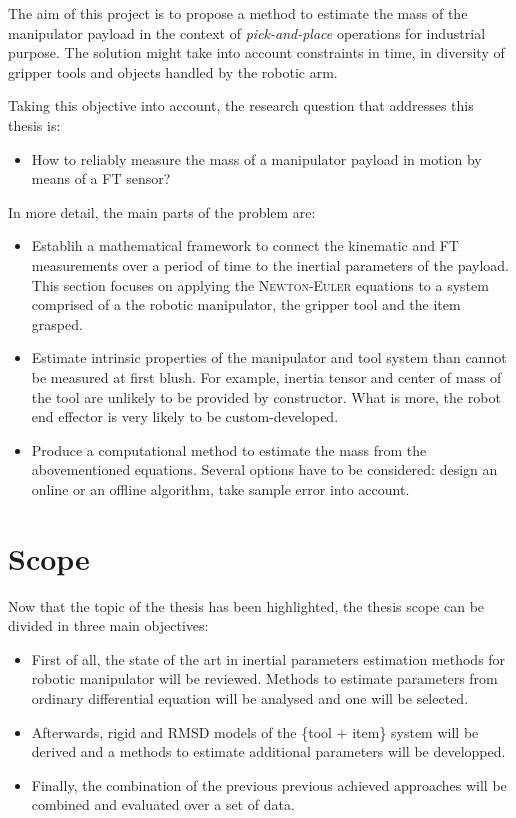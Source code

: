 \documentclass[/home/francois/latex/report/main.tex]{subfiles}
\begin{document}
The aim of this project is to propose a method to estimate the mass of the manipulator payload in the context of \textit{pick-and-place} operations for industrial purpose. The solution might take into account constraints in time, in diversity of gripper tools and objects handled by the robotic arm.

Taking this objective into account, the research question that addresses this thesis is:

\begin{itemize}%
  \renewcommand{\labelitemi}{$\Rightarrow$}
 \item How to reliably measure the mass of a manipulator payload in motion by means of a \ac{FT} sensor?
\end{itemize}

In more detail, the main parts of the problem are:

\begin{itemize}
 \item Establih a mathematical framework to connect the kinematic and \ac{FT} measurements over a period of time to the inertial parameters of the payload. This section focuses on applying the \textsc{Newton-Euler} equations to a system comprised of a the robotic manipulator, the gripper tool and the item grasped.
 \item Estimate intrinsic properties of the manipulator and tool system than cannot be measured at first blush. For example, inertia tensor and center of mass of the tool are unlikely to be provided by constructor. What is more, the robot end effector is very likely to be custom-developed.
 \item Produce a computational method to estimate the mass from the abovementioned equations. Several options have to be considered: design an online or an offline algorithm, take sample error into account.
\end{itemize}

\section{Scope}

Now that the topic of the thesis has been highlighted, the thesis scope can be divided in three main objectives:

\begin{itemize}
	\item First of all, the state of the art in inertial parameters estimation methods for robotic manipulator will be reviewed. Methods to estimate parameters from ordinary differential equation will be analysed and one will be selected.
	\item Afterwards, rigid and \ac{RMSD} models of the \{tool + item\} system will be derived and a methods to estimate additional parameters will be developped.
	\item Finally, the combination of the previous previous achieved approaches will be combined and evaluated over a set of data.
\end{itemize}
\end{document}
